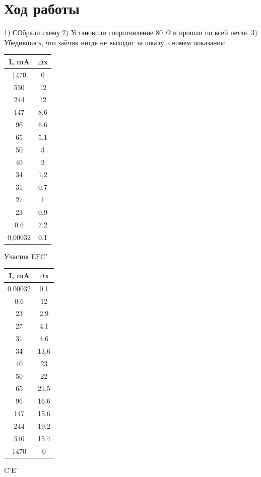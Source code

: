 \documentclass[a4paper,12pt]{article} %
\begin{document}
\section{Ход работы}
1) СОбрали схему
2) Установили сопротивление 80 $\Omega$ и прошли по всей петле.
3) Убедившись, что зайчик нигде не выходит за шкалу, снимем показания:\\
\begin{tabular}{|c|c|}
\hline 
I, mA & $\Delta$x \\ 
\hline 
1470 & 0 \\ 
\hline 
530 & 12 \\ 
\hline 
244 & 12 \\ 
\hline 
147 & 8.6 \\ 
\hline 
96 & 6.6 \\ 
\hline 
65 & 5.1 \\ 
\hline 
50 & 3 \\ 
\hline 
40 & 2 \\ 
\hline 
34 & 1,2 \\ 
\hline 
31 & 0,7 \\ 
\hline 
27 & 1 \\ 
\hline 
23 & 0.9 \\ 
\hline 
0.6 & 7.2 \\ 
\hline 
0,00032 & 0.1 \\ 
\hline 
\end{tabular} 
Участок EFC'
\begin{tabular}{|c|c|}
\hline 
I, mA & $\Delta$x \\ 
\hline 
0.00032 & 0.1 \\ 
\hline 
0.6 & 12 \\ 
\hline 
23 & 2.9 \\ 
\hline 
27 & 4.1 \\ 
\hline 
31 & 4.6 \\ 
\hline 
34 & 13.6 \\ 
\hline 
40 & 23 \\ 
\hline 
50 & 22 \\ 
\hline 
65 & 21.5 \\ 
\hline 
96 & 16.6 \\ 
\hline 
147 & 15.6 \\ 
\hline 
244 & 19.2 \\ 
\hline 
540 & 15.4 \\ 
\hline 
1470 & 0 \\ 
\hline 
\end{tabular} 
C'E'
\end{document}
